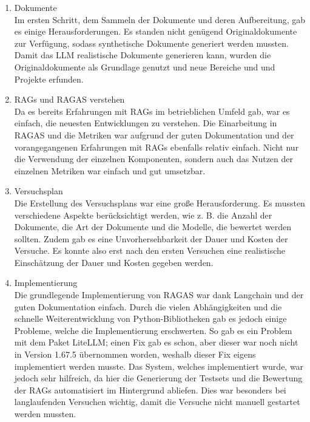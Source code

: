 \begin{enumerate}

    \item{Dokumente}\\
    Im ersten Schritt, dem Sammeln der Dokumente und deren Aufbereitung, gab es einige Herausforderungen.
    Es standen nicht genügend Originaldokumente zur Verfügung, sodass synthetische Dokumente generiert werden mussten.
    Damit das LLM realistische Dokumente generieren kann, wurden die Originaldokumente als Grundlage genutzt und neue Bereiche und und Projekte erfunden.

    \item{RAGs und RAGAS verstehen}\\
    Da es bereits Erfahrungen mit RAGs im betrieblichen Umfeld gab, war es einfach, die neuesten Entwicklungen zu verstehen.
    Die Einarbeitung in RAGAS und die Metriken war aufgrund der guten Dokumentation und der vorangegangenen Erfahrungen mit RAGs ebenfalls relativ einfach.
    Nicht nur die Verwendung der einzelnen Komponenten, sondern auch das Nutzen der einzelnen Metriken war einfach und gut umsetzbar.

    \item{Versuchsplan}\\
    Die Erstellung des Versuchsplans war eine große Herausforderung.
    Es mussten verschiedene Aspekte berücksichtigt werden, wie z. B. die Anzahl der Dokumente, die Art der Dokumente und die Modelle, die bewertet werden sollten.
    Zudem gab es eine Unvorhersehbarkeit der Dauer und Kosten der Versuche.
    Es konnte also erst nach den ersten Versuchen eine realistische Einschätzung der Dauer und Kosten gegeben werden.

    \item{Implementierung}\\
    Die grundlegende Implementierung von RAGAS war dank Langchain und der guten Dokumentation einfach.
    Durch die vielen Abhängigkeiten und die schnelle Weiterentwicklung von Python-Bibliotheken gab es jedoch einige Probleme, welche die Implementierung erschwerten.
    So gab es ein Problem mit dem Paket LiteLLM; einen Fix gab es schon, aber dieser war noch nicht in Version 1.67.5 übernommen worden, weshalb dieser Fix eigens implementiert werden musste.
    Das System, welches implementiert wurde, war jedoch sehr hilfreich, da hier die Generierung der Testsets und die Bewertung der RAGs automatisiert im Hintergrund abliefen.
    Dies war besonders bei langlaufenden Versuchen wichtig, damit die Versuche nicht manuell gestartet werden mussten.


\end{enumerate}
